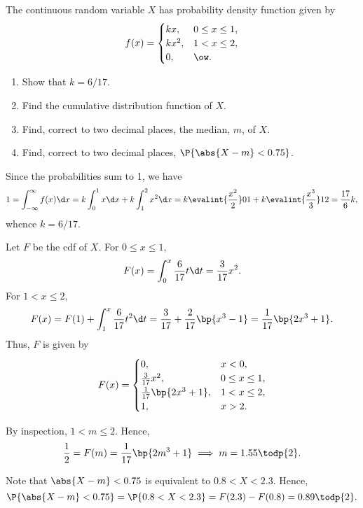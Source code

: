 \begin{problem}
    The continuous random variable $X$ has probability density function given by \[f(x) = \begin{cases}
        kx, & 0 \leq x \leq 1,\\
        kx^2, & 1 < x \leq 2,\\
        0, & \ow.
    \end{cases}\]
    
    \begin{enumerate}
        \item Show that $k = 6/17$.
        \item Find the cumulative distribution function of $X$.
        \item Find, correct to two decimal places, the median, $m$, of $X$.
        \item Find, correct to two decimal places, $\P{\abs{X - m} < 0.75}$.
    \end{enumerate}
\end{problem}
\begin{solution}
    \begin{ppart}
        Since the probabilities sum to 1, we have \[1 = \int_{-\infty}^\infty f(x) \d x = k \int_0^1 x \d x + k \int_1^2 x^2 \d x = k \evalint{\frac{x^2}2}01 + k\evalint{\frac{x^3}{3}}12 = \frac{17}{6} k,\] whence $k = 6/17$.
    \end{ppart}
    \begin{ppart}
        Let $F$ be the cdf of $X$. For $0 \leq x \leq 1$, \[F(x) = \int_0^x \frac{6}{17} t \d t = \frac3{17} x^2.\] For $1 < x \leq 2$, \[F(x) = F(1) + \int_1^x \frac6{17} t^2 \d t = \frac3{17} + \frac{2}{17} \bp{x^3 - 1} = \frac1{17} \bp{2x^3 + 1}.\] Thus, $F$ is given by \[F(x) = \begin{cases}
            0, & x < 0,\\
            \frac3{17} x^2, & 0 \leq x \leq 1,\\
            \frac1{17} \bp{2x^3 + 1}, & 1 < x \leq 2,\\
            1, & x > 2.
        \end{cases}\]
    \end{ppart}
    \begin{ppart}
        By inspection, $1 < m \leq 2$. Hence, \[\frac12 = F(m) = \frac{1}{17} \bp{2m^3 + 1} \implies m = 1.55 \todp{2}.\]
    \end{ppart}
    \begin{ppart}
        Note that $\abs{X - m} < 0.75$ is equivalent to $0.8 < X < 2.3$. Hence, \[\P{\abs{X - m} < 0.75} = \P{0.8 < X < 2.3} = F(2.3) - F(0.8) = 0.89 \todp{2}.\]
    \end{ppart}
\end{solution}

